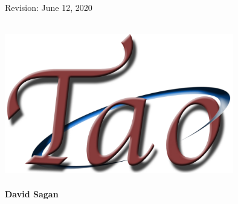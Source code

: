 \thispagestyle{empty}

\begin{flushright}
\large
Revision: June 12, 2020 \\
\end{flushright}

\vfill


{
\begin{center}
 \\
\vskip 0.2in
\includegraphics[width=10cm]{tao-logo.pdf} \\
\vskip 0.3in
 \\
\vskip 0.4in
{\huge \sf\bf David Sagan} \\
\end{center}
}

\vfill
\break
